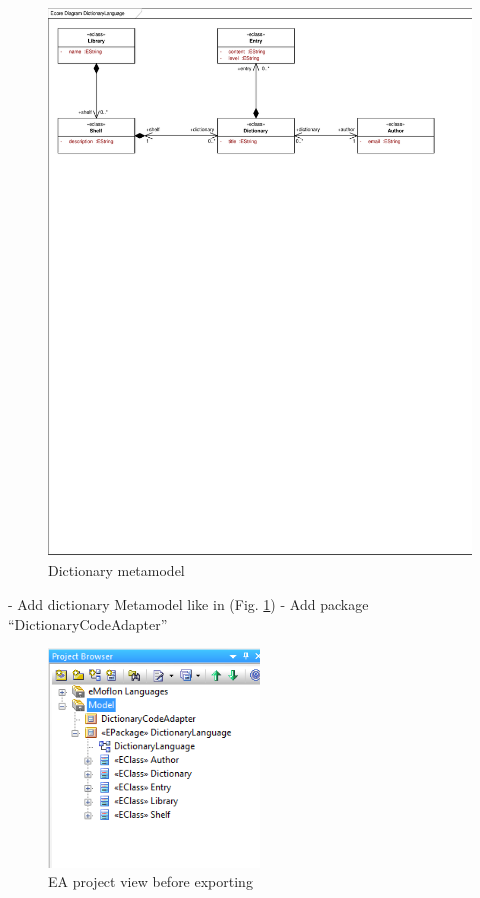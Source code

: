 \begin{figure}[!htbp]
\begin{center}
 \includegraphics[width=\textwidth]{pics/moca/1DictionaryMetaModel/DictionaryLanguage}
  \caption{Dictionary metamodel}
  \label{moca-5-DictionaryMM}
\end{center}
\end{figure}

- Add dictionary Metamodel like in (Fig. \ref{moca-5-DictionaryMM})
- Add package ``DictionaryCodeAdapter''

\begin{figure}[!htbp]
\begin{center}
 \includegraphics[width=0.5\textwidth]{pics/moca/1DictionaryMetaModel/5-DictionaryMM-ProjectBrowser}
  \caption{EA project view before exporting}
  \label{moca-5-DictionaryMM-ProjectBrowser}
\end{center}
\end{figure}

